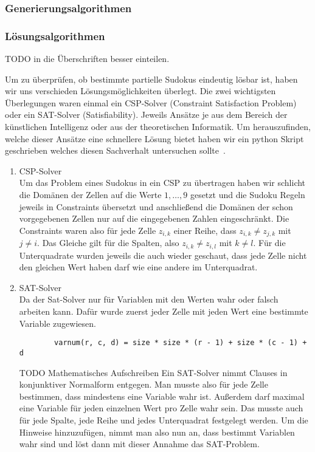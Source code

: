 \documentclass[12pt,a4paper]{article}
\begin{document}
\subsubsection{Generierungsalgorithmen}


\subsubsection{Lösungsalgorithmen}

TODO in die Überschriften besser einteilen.

Um zu überprüfen, ob bestimmte partielle Sudokus eindeutig lösbar ist, haben wir uns verschieden Lösungsmöglichkeiten überlegt.
Die zwei wichtigsten Überlegungen waren einmal ein CSP-Solver (Constraint Satisfaction Problem) oder ein SAT-Solver (Satisfiability).
Jeweils Ansätze je aus dem Bereich der künstlichen Intelligenz oder aus der theoretischen Informatik.
Um herauszufinden, welche dieser Ansätze eine schnellere Lösung bietet haben wir ein python Skript geschrieben welches diesen Sachverhalt untersuchen sollte~\cite{TODO}.
\begin{enumerate}
    \item CSP-Solver \\
    Um das Problem eines Sudokus in ein CSP zu übertragen haben wir schlicht die Domänen der Zellen auf die Werte $1, \dots, 9$ gesetzt und die Sudoku Regeln jeweils in Constraints übersetzt und anschließend die Domänen der schon vorgegebenen Zellen nur auf die eingegebenen Zahlen eingeschränkt.
    Die Constraints waren also für jede Zelle $z_{i, k}$ einer Reihe, dass $z_{i, k} \neq z_{j, k}$ mit $j \neq i$.
    Das Gleiche gilt für die Spalten, also $z_{i, k} \neq z_{i, l}$ mit $k \neq l$.
    Für die Unterquadrate wurden jeweils die auch wieder geschaut, dass jede Zelle nicht den gleichen Wert haben darf wie eine andere im Unterquadrat.
    \item SAT-Solver \\
    Da der Sat-Solver nur für Variablen mit den Werten wahr oder falsch arbeiten kann.
    Dafür wurde zuerst jeder Zelle mit jeden Wert eine bestimmte Variable zugewiesen.
    \begin{verbatim}
        varnum(r, c, d) = size * size * (r - 1) + size * (c - 1) + d
    \end{verbatim}
    TODO Mathematisches Aufschreiben
    Ein SAT-Solver nimmt Clauses in konjunktiver Normalform entgegen.
    Man musste also für jede Zelle bestimmen, dass mindestens eine Variable wahr ist.
    Außerdem darf maximal eine Variable für jeden einzelnen Wert pro Zelle wahr sein.
    Das musste auch für jede Spalte, jede Reihe und jedes Unterquadrat festgelegt werden.
    Um die Hinweise hinzuzufügen, nimmt man also nun an, dass bestimmt Variablen wahr sind und löst dann mit dieser Annahme das SAT-Problem.
\end{enumerate}
\end{document}
